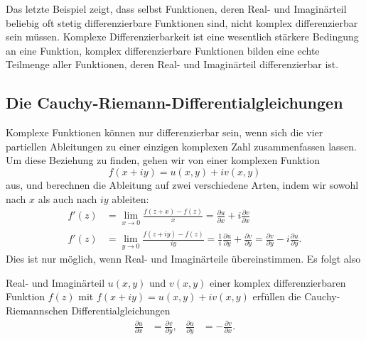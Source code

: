 Das letzte Beispiel zeigt, dass
selbst Funktionen, deren Real- und Imaginärteil beliebig oft stetig
differenzierbare Funktionen sind, nicht komplex differenzierbar
sein müssen.
Komplexe Differenzierbarkeit ist eine wesentlich stärkere Bedingung
an eine Funktion, komplex differenzierbare Funktionen bilden eine
echte Teilmenge aller Funktionen, deren Real- und Imaginärteil
differenzierbar ist.

%
%
\subsection{Die Cauchy-Riemann-Differentialgleichungen}
Komplexe Funktionen können nur differenzierbar sein, wenn sich die vier
partiellen Ableitungen zu einer einzigen komplexen Zahl zusammenfassen
lassen.
Um diese Beziehung zu finden, gehen wir von einer komplexen Funktion
\[
f(x+iy) = u(x,y) + iv(x,y)
\]
aus, und berechnen die Ableitung auf zwei verschiedene Arten, indem
wir sowohl nach $x$ als auch nach $iy$ ableiten:
\begin{align*}
f'(z)&
=
\lim_{x\to 0}\frac{f(z+x)-f(z)}{x}
=
\frac{\partial u}{\partial x}+i\frac{\partial v}{\partial x}
\\
f'(z)&
=
\lim_{y\to 0}\frac{f(z+iy)-f(z)}{iy}
=
\frac1{i}
\frac{\partial u}{\partial y}+\frac{\partial v}{\partial y}
=
\frac{\partial v}{\partial y}
-i
\frac{\partial u}{\partial y}.
\end{align*}
Dies ist nur möglich, wenn Real- und Imaginärteile übereinstimmen.
Es folgt also

\begin{satz}
%
\label{komplex:satz:cauchy-riemann}
Real- und Imaginärteil $u(x,y)$ und $v(x,y)$ einer
komplex differenzierbaren Funktion $f(z)$ mit $f(x+iy)=u(x,y)+iv(x,y)$
erfüllen die Cauchy-Riemannschen Differentialgleichungen
\begin{equation}
\begin{aligned}
\frac{\partial u}{\partial x}
&=
\frac{\partial v}{\partial y},
&
\frac{\partial u}{\partial y}
&=
-
\frac{\partial v}{\partial x}.
\end{aligned}
\label{komplex:dgl:cauchy-riemann}
\end{equation}
\end{satz}

